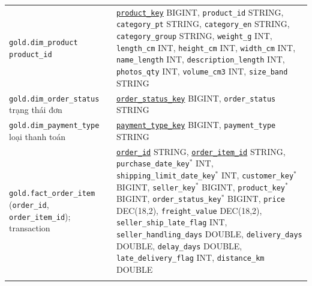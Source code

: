 \documentclass[a4paper]{article}
\begin{document}
{\begin{longtable}{@{}>{\raggedright\arraybackslash}p{3.6cm}>{\raggedright\arraybackslash}p{12.6cm}@{}}
\addlinespace
\texttt{gold.dim\_\allowbreak{}product} \newline 1 \texttt{product\_\allowbreak{}id} & \underline{\texttt{product\_\allowbreak{}key}} BIGINT, \texttt{product\_\allowbreak{}id} STRING, \texttt{category\_\allowbreak{}pt} STRING, \texttt{category\_\allowbreak{}en} STRING, \texttt{category\_\allowbreak{}group} STRING, \texttt{weight\_\allowbreak{}g} INT, \texttt{length\_\allowbreak{}cm} INT, \texttt{height\_\allowbreak{}cm} INT, \texttt{width\_\allowbreak{}cm} INT, \texttt{name\_\allowbreak{}length} INT, \texttt{description\_\allowbreak{}length} INT, \texttt{photos\_\allowbreak{}qty} INT, \texttt{volume\_\allowbreak{}cm3} INT, \texttt{size\_\allowbreak{}band} STRING \\
\addlinespace
\texttt{gold.dim\_\allowbreak{}order\_\allowbreak{}status} \newline 1 trạng thái đơn & \underline{\texttt{order\_\allowbreak{}status\_\allowbreak{}key}} BIGINT, \texttt{order\_\allowbreak{}status} STRING \\
\addlinespace
\texttt{gold.dim\_\allowbreak{}payment\_\allowbreak{}type} \newline 1 loại thanh toán & \underline{\texttt{payment\_\allowbreak{}type\_\allowbreak{}key}} BIGINT, \texttt{payment\_\allowbreak{}type} STRING \\
\addlinespace
\texttt{gold.fact\_\allowbreak{}order\_\allowbreak{}item} \newline 1 (\texttt{order\_\allowbreak{}id}, \texttt{order\_\allowbreak{}item\_\allowbreak{}id}); transaction & \underline{\texttt{order\_\allowbreak{}id}} STRING, \underline{\texttt{order\_\allowbreak{}item\_\allowbreak{}id}} STRING, \texttt{purchase\_\allowbreak{}date\_\allowbreak{}key}$^{*}$ INT, \texttt{shipping\_\allowbreak{}limit\_\allowbreak{}date\_\allowbreak{}key}$^{*}$ INT, \texttt{customer\_\allowbreak{}key}$^{*}$ BIGINT, \texttt{seller\_\allowbreak{}key}$^{*}$ BIGINT, \texttt{product\_\allowbreak{}key}$^{*}$ BIGINT, \texttt{order\_\allowbreak{}status\_\allowbreak{}key}$^{*}$ BIGINT, \texttt{price} DEC(18,2), \texttt{freight\_\allowbreak{}value} DEC(18,2), \texttt{seller\_\allowbreak{}ship\_\allowbreak{}late\_\allowbreak{}flag} INT, \texttt{seller\_\allowbreak{}handling\_\allowbreak{}days} DOUBLE, \texttt{delivery\_\allowbreak{}days} DOUBLE, \texttt{delay\_\allowbreak{}days} DOUBLE, \texttt{late\_\allowbreak{}delivery\_\allowbreak{}flag} INT, \texttt{distance\_\allowbreak{}km} DOUBLE \\
\addlinespace

\end{longtable}}
\end{document}
